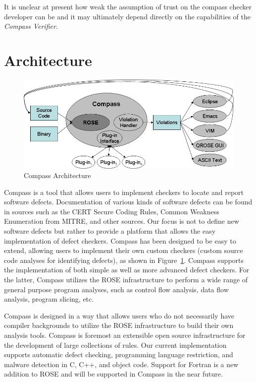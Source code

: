 It is unclear at present how weak the assumption of trust on the compass checker developer 
can be and it may ultimately depend directly on the capabilities of the \emph{Compass Verifier}.


\section{Architecture}

\begin{figure}[thb]
\includegraphics[width=6.0in]{compass_arc.png}
\caption{Compass Architecture}
\label{CompassArchitecture}
\end{figure}


Compass is a tool that allows users to implement checkers to locate and
report software defects.
Documentation of various kinds of software defects can be found in sources
such as the CERT Secure Coding Rules, Common Weakness Enumeration from MITRE, 
and other sources. Our focus is not to define new software defects but
rather to provide a platform that allows the easy implementation of defect
checkers.  Compass has been designed to be easy to extend, allowing users to 
implement their own custom checkers (custom source code analyses for
identifying defects), as shown in Figure~\ref{CompassArchitecture}. Compass supports
the implementation of both simple as well as more advanced defect
checkers. For the latter, Compass utilizes the ROSE infrastructure to
perform a wide range of general purpose program analyses, such as control
flow analysis, data flow analysis, program slicing, etc.


Compass is designed in a way that allows users who do not necessarily have
compiler backgrounds to utilize the ROSE infrastructure to build their
own analysis tools.
Compass is foremost an extensible open source infrastructure for the
development of large
collections of rules. Our current implementation supports automatic
defect checking, programming language restriction, and malware detection in
C, C++, and object code.
Support for Fortran is a new addition to ROSE and will be supported in
Compass in the near future.




